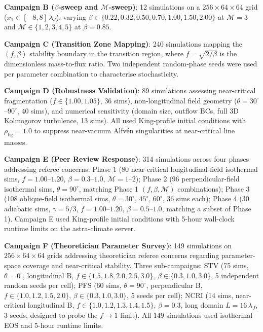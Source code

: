 \documentclass[usenatbib]{rasti}
\begin{document}
\textbf{Campaign B ($\beta$-sweep and $\mathcal{M}$-sweep)}: 12 simulations on a
$256 \times 64 \times 64$ grid ($x_1 \in [-8,8]\,\lambda_J$), varying $\beta \in
\{0.22, 0.32, 0.50, 0.70, 1.00, 1.50, 2.00\}$ at $\mathcal{M}=3$ and
$\mathcal{M} \in \{1, 2, 3, 4, 5\}$ at $\beta = 0.85$.

\textbf{Campaign C (Transition Zone Mapping)}: 240 simulations mapping the $(f, \beta)$
stability boundary in the transition region, where $f = \sqrt{2/\beta}$ is the
dimensionless mass-to-flux ratio. Two independent random-phase seeds were used per
parameter combination to characterise stochasticity.

\textbf{Campaign D (Robustness Validation)}: 89 simulations assessing near-critical
fragmentation ($f \in \{1.00, 1.05\}$, 36 sims), non-longitudinal field geometry ($\theta
= 30^\circ$--$90^\circ$, 40 sims), and numerical sensitivity (domain size, outflow BCs,
full 3D Kolmogorov turbulence, 13 sims). All used King-profile initial conditions with
$\rho_\mathrm{bg} = 1.0$ to suppress near-vacuum Alfv\'{e}n singularities at near-critical
line masses.

\textbf{Campaign E (Peer Review Response)}: 314 simulations across four phases addressing
referee concerns: Phase 1 (80 near-critical longitudinal-field isothermal sims, $f =
1.00$--$1.20$, $\beta = 0.3$--$1.0$, $\mathcal{M} = 1$--$2$); Phase 2 (96 perpendicular-field
isothermal sims, $\theta = 90^\circ$, matching Phase 1 $(f,\beta,\mathcal{M})$
combinations); Phase 3 (108 oblique-field isothermal sims, $\theta = 30^\circ$, $45^\circ$,
$60^\circ$, 36 sims each); Phase 4 (30 adiabatic sims, $\gamma = 5/3$, $f = 1.00$--$1.20$,
$\beta = 0.5$--$1.0$, matching a subset of Phase 1). Campaign E used King-profile initial
conditions with 5-hour wall-clock runtime limits on the astra-climate server.

\textbf{Campaign F (Theoretician Parameter Survey)}: 149 simulations on $256 \times 64 \times
64$ grids addressing theoretician referee concerns regarding parameter-space coverage and
near-critical stability. Three sub-campaigns: STV (75 sims, $\theta = 0^\circ$, longitudinal
B, $f \in \{1.5, 1.8, 2.0, 2.5, 3.0\}$, $\beta \in \{0.3, 1.0, 3.0\}$, 5 independent random
seeds per cell); PFS (60 sims, $\theta = 90^\circ$, perpendicular B, $f \in \{1.0, 1.2, 1.5,
2.0\}$, $\beta \in \{0.3, 1.0, 3.0\}$, 5 seeds per cell); NCRI (14 sims, near-critical
longitudinal B, $f \in \{1.0, 1.2, 1.3, 1.4, 1.5\}$, $\beta = 0.3$, long domain
$L = 16\,\lambda_J$, 3 seeds, designed to probe the $f \to 1$ limit). All 149 simulations used
isothermal EOS and 5-hour runtime limits.
\end{document}
